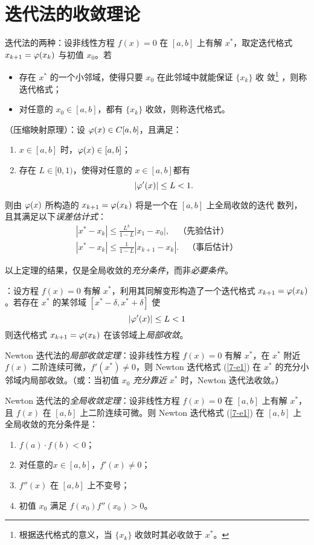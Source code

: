 \section{迭代法的收敛理论}
\entry 迭代法的两种：设非线性方程 $f(x)=0$ 在 $[a,b]$ 上有解 $x^\ast$，取定迭代格式 $x_{k+1}=\varphi(x_k)$ 与初值 $x_0$。若
\begin{itemize}\tl
    \item 存在 $x^\ast$ 的一个小邻域，使得只要 $x_0$ 在此邻域中就能保证 $\{x_k\}$ 收
    敛\footnote{根据迭代格式的意义，当 $\{x_k\}$ 收敛时其必收敛于 $x^\ast$。}
    ，则称迭代格式；
    \item 对任意的 $x_0\in[a,b]$，都有 $\{x_k\}$ 收敛，则称迭代格式。
\end{itemize}

\trm {}（压缩映射原理）：设 $\varphi(x)\in C[a,b]$，且满足：
\begin{enumerate}\tl
    \item $x\in[a,b]$ 时，$\varphi(x)\in[a,b]$；
    \item 存在 $L\in[0,1)$，使得对任意的 $x\in[a,b]$都有
    \begin{equation}
    |\varphi'(x)|\leq L<1.
    \end{equation}
\end{enumerate}
则由 $\varphi(x)$ 所构造的 $x_{k+1}=\varphi(x_k)$ 将是一个在 $[a,b]$ 上全局收敛的迭代
数列，且其满足以下\emph{误差估计式}：
\begin{gather}
|x^\ast-x_k|\leq\frac{L^k}{1-L}|x_1-x_0|,\quad\text{（先验估计）}\\
|x^\ast-x_k|\leq\frac1{1-L}|x_{k+1}-x_k|.\quad\text{（事后估计）}
\end{gather}

\entry 以上定理的结果，仅是全局收敛的\emph{充分条件}，而非\emph{必要条件}。

\trm {}：设方程 $f(x)=0$ 有解 $x^\ast$，利用其同解变形构造了一个迭代格式
$x_{k+1}=\varphi(x_k)$。若存在 $x^\ast$ 的某邻域 $[x^\ast-\delta,x^\ast+\delta]$ 使
\[ |\varphi'(x)|\leq L<1 \]
则迭代格式 $x_{k+1}=\varphi(x_k)$ 在该邻域上\emph{局部收敛}。

\trm Newton 迭代法的\emph{局部收敛定理}：设非线性方程 $f(x)=0$ 有解 $x^\ast$，在 $x^\ast$
附近 $f(x)$ 二阶连续可微，$f'(x^\ast)\neq0$，则 Newton 迭代格式 (\ref{7-e1}) 在 
$x^\ast$ 的充分小邻域内局部收敛。（或：当初值 $x_0$ \emph{充分靠近} $x^\ast$ 时，Newton
迭代法收敛。）

\trm Newton 迭代法的\emph{全局收敛定理}：设非线性方程 $f(x)=0$ 在 $[a,b]$ 上有解 $x^\ast$，
且 $f(x)$ 在 $[a,b]$ 上二阶连续可微。则 Newton 迭代格式 (\ref{7-e1}) 在 $[a,b]$ 上
全局收敛的充分条件是：
\begin{enumerate}\tl
    \item $f(a)\cdot f(b)<0$；
    \item 对任意的$x\in[a,b]$，$f'(x)\neq0$；
    \item $f''(x)$ 在 $[a,b]$ 上不变号；
    \item 初值 $x_0$ 满足 $f(x_0)f''(x_0)>0$。
\end{enumerate}

